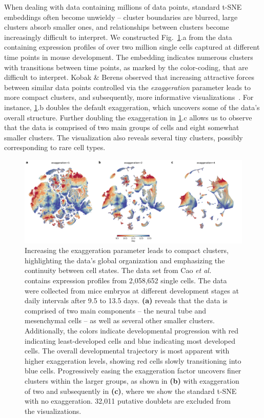 \documentclass[twocolumn]{bmcart}
\begin{document}
When dealing with data containing millions of data points, standard t-SNE embeddings often become unwieldy -- cluster boundaries are blurred, large clusters absorb smaller ones, and relationships between clusters become increasingly difficult to interpret. We constructed Fig.~\ref{fig:cao}.a from the data containing expression profiles of over two million single cells captured at different time points in mouse development. The embedding indicates numerous clusters with transitions between time points, as marked by the color-coding, that are difficult to interpret. Kobak \& Berens observed that increasing attractive forces between similar data points controlled via the \textit{exaggeration} parameter leads to more compact clusters, and subsequently, more informative visualizations~\cite{kobak2019art}. For instance, \ref{fig:cao}.b doubles the default exaggeration, which uncovers some of the data's overall structure. Further doubling the exaggeration in \ref{fig:cao}.c allows us to observe that the data is comprised of two main groups of cells and eight somewhat smaller clusters. The visualization also reveals several tiny clusters, possibly corresponding to
rare cell types.

\begin{figure}[htbp]
  \includegraphics[width=\textwidth]{cao2019}
  \caption{\label{fig:cao}
Increasing the exaggeration parameter leads to compact clusters, highlighting the data's global organization and emphasizing the continuity between cell states. The data set from Cao \textit{et al.}~\cite{cao2019single} contains expression profiles from 2,058,652 single cells. The data were collected from mice embryos at different development stages at daily intervals after 9.5 to 13.5 days. \textbf{(a)} reveals that the data is comprised of two main components -- the neural tube and mesenchymal cells -- as well as several other smaller clusters. Additionally, the colors indicate developmental progression with red indicating least-developed cells and blue indicating most developed cells. The overall developmental trajectory is most apparent with higher exaggeration levels, showing red cells slowly transitioning into blue cells. Progressively easing the exaggeration factor uncovers finer clusters within the larger groups, as shown in
\textbf{(b)} with exaggeration of two and subsequently in \textbf{(c)}, where we show the standard t-SNE with no exaggeration. 32,011 putative doublets are excluded from the visualizations.
}
\end{figure}
\end{document}
